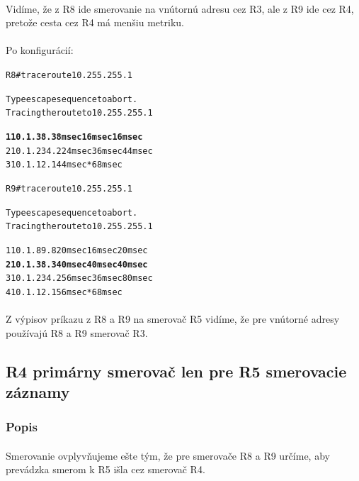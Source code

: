 \documentclass[12pt,twoside,a4paper]{report}
\begin{document}
\paragraph{}
Vidíme, že z R8 ide smerovanie na vnútornú adresu cez R3, ale z R9 ide cez R4, pretože cesta cez R4 má menšiu metriku.



\paragraph{}
Po konfigurácií:

\noindent
{\selectfont
\begin{small}
\begin{alltt}
R8#traceroute 10.255.255.1

Type escape sequence to abort.
Tracing the route to 10.255.255.1

\textbf{  1 10.1.38.3 8 msec 16 msec 16 msec}
  2 10.1.234.2 24 msec 36 msec 44 msec
  3 10.1.12.1 44 msec *  68 msec



R9#traceroute 10.255.255.1

Type escape sequence to abort.
Tracing the route to 10.255.255.1

  1 10.1.89.8 20 msec 16 msec 20 msec
\textbf{  2 10.1.38.3 40 msec 40 msec 40 msec}
  3 10.1.234.2 56 msec 36 msec 80 msec
  4 10.1.12.1 56 msec *  68 msec
\end{alltt}
\end{small}
}

\paragraph{}
Z výpisov príkazu  z R8 a R9 na smerovač R5 vidíme, že pre vnútorné adresy používajú R8 a R9 smerovač R3.






\subsection{R4 primárny smerovač len pre R5 smerovacie záznamy}
\subsubsection{Popis}
\paragraph{}
Smerovanie ovplyvňujeme ešte tým, že pre smerovače R8 a R9 určíme, aby prevádzka smerom k R5 išla cez smerovač R4.
\end{document}
